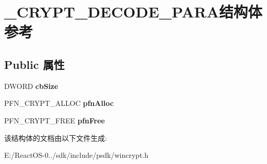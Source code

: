 \hypertarget{struct___c_r_y_p_t___d_e_c_o_d_e___p_a_r_a}{}\section{\+\_\+\+C\+R\+Y\+P\+T\+\_\+\+D\+E\+C\+O\+D\+E\+\_\+\+P\+A\+R\+A结构体 参考}
\label{struct___c_r_y_p_t___d_e_c_o_d_e___p_a_r_a}
\subsection*{Public 属性}
\begin{DoxyCompactItemize}
\item 
\mbox{\label{struct___c_r_y_p_t___d_e_c_o_d_e___p_a_r_a_afe36d562b8e09150d8c846b2267ef5ab}} 
D\+W\+O\+RD {\bfseries cb\+Size}
\item 
\mbox{\label{struct___c_r_y_p_t___d_e_c_o_d_e___p_a_r_a_afe21c560ce1eaa9ee321c6ca3d167325}} 
P\+F\+N\+\_\+\+C\+R\+Y\+P\+T\+\_\+\+A\+L\+L\+OC {\bfseries pfn\+Alloc}
\item 
\mbox{\label{struct___c_r_y_p_t___d_e_c_o_d_e___p_a_r_a_a37397e5cfb8e4b8560948ca5a855227f}} 
P\+F\+N\+\_\+\+C\+R\+Y\+P\+T\+\_\+\+F\+R\+EE {\bfseries pfn\+Free}
\end{DoxyCompactItemize}


该结构体的文档由以下文件生成\+:\begin{DoxyCompactItemize}
\item 
E\+:/\+React\+O\+S-\/0../sdk/include/psdk/wincrypt.\+h\end{DoxyCompactItemize}
